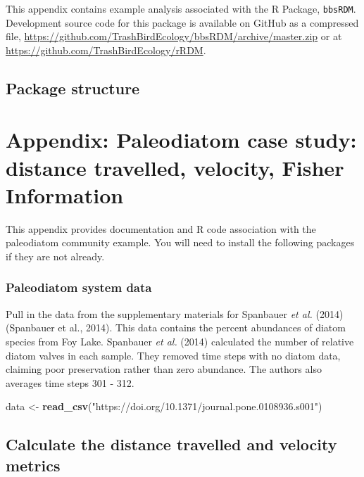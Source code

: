 \documentclass[12pt,twoside,openany]{reedthesis}
\newenvironment{Shaded}{\begin{snugshade}}{\end{snugshade}}
\newcommand{\KeywordTok}[1]{\textcolor[rgb]{0.13,0.29,0.53}{\textbf{#1}}}
\newcommand{\NormalTok}[1]{#1}
\newcommand{\StringTok}[1]{\textcolor[rgb]{0.31,0.60,0.02}{#1}}
\begin{document}
This appendix contains example analysis associated with the R Package, \texttt{bbsRDM}. Development source code for this package is available on GitHub as a compressed file, \url{https://github.com/TrashBirdEcology/bbsRDM/archive/master.zip} or at \url{https://github.com/TrashBirdEcology/rRDM}.

\hypertarget{package-structure}{%
\section{Package structure}\label{package-structure}}

\hypertarget{appPaleo}{%
\chapter*{Appendix: Paleodiatom case study: distance travelled, velocity, Fisher Information}\label{appPaleo}}

This appendix provides documentation and R code association with the paleodiatom community example.
You will need to install the following packages if they are not already.

\hypertarget{paleodiatom-system-data}{%
\subsection{Paleodiatom system data}\label{paleodiatom-system-data}}

Pull in the data from the supplementary materials for Spanbauer \emph{et al.} (2014) (Spanbauer et al., 2014). This data contains the percent abundances of diatom species from Foy Lake. Spanbauer \emph{et al.} (2014) calculated the number of relative diatom valves in each sample. They removed time steps with no diatom data, claiming poor preservation rather than zero abundance. The authors also averages time steps 301 - 312.
\begin{Shaded}
\begin{Highlighting}[]
\NormalTok{data <-}\StringTok{ }\KeywordTok{read_csv}\NormalTok{(}\StringTok{"https://doi.org/10.1371/journal.pone.0108936.s001"}\NormalTok{)}
\end{Highlighting}
\end{Shaded}
\hypertarget{calculate-the-distance-travelled-and-velocity-metrics}{%
\section{Calculate the distance travelled and velocity metrics}\label{calculate-the-distance-travelled-and-velocity-metrics}}
\end{document}
